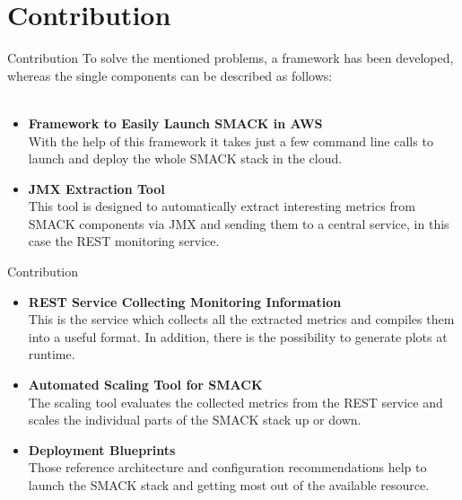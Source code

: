 \documentclass[10pt]{beamer}
\begin{document}
\section{Contribution}

\begin{frame}{Contribution}
	To solve the mentioned problems, a framework has been developed, whereas the single components can be described as follows:\\
	\hfill \\

	\begin{itemize}
   	 \item \textbf{Framework to Easily Launch SMACK in AWS}\\
          With the help of this framework it takes just a few command line calls to launch and deploy the whole SMACK stack in the cloud.
  	  \item \textbf{JMX Extraction Tool}\\
          This tool is designed to automatically extract interesting metrics from SMACK components via JMX and sending them to a central service, in this case the REST monitoring service.
	\end{itemize}
\end{frame}

\begin{frame}{Contribution}
	\begin{itemize}
   	 \item \textbf{REST Service Collecting Monitoring Information}\\
          This is the service which collects all the extracted metrics and compiles them into a useful format.
          In addition, there is the possibility to generate plots at runtime.
  	  \item \textbf{Automated Scaling Tool for SMACK}\\
          The scaling tool evaluates the collected metrics from the REST service and scales the individual parts of the SMACK stack up or down.
   	 \item \textbf{Deployment Blueprints}\\
          Those reference architecture and configuration recommendations help to launch the SMACK stack and getting most out of the available resource.
	\end{itemize}
\end{frame}
\end{document}
